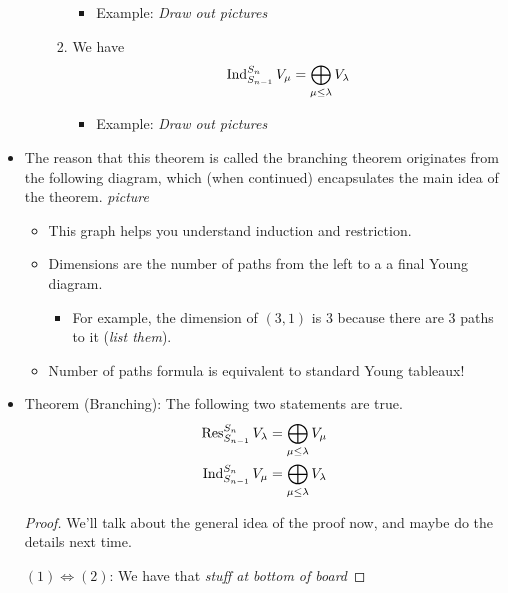 \documentclass[../notes.tex]{subfiles}
\begin{document}
\begin{itemize}
\begin{itemize}
\begin{enumerate}
\begin{itemize}
                \item Example: \emph{Draw out pictures}
            \end{itemize}
            \item We have
            \begin{equation*}
                \operatorname{Ind}_{S_{n-1}}^{S_n}V_\mu = \bigoplus_{\mu\leq\lambda}V_\lambda
            \end{equation*}
            \begin{itemize}
                \item Example: \emph{Draw out pictures}
            \end{itemize}
        \end{enumerate}
    \end{itemize}
    \item The reason that this theorem is called the branching theorem originates from the following diagram, which (when continued) encapsulates the main idea of the theorem.
    \emph{picture}
    \begin{itemize}
        \item This graph helps you understand induction and restriction.
        \item Dimensions are the number of paths from the left to a a final Young diagram.
        \begin{itemize}
            \item For example, the dimension of $(3,1)$ is 3 because there are 3 paths to it (\emph{list them}).
        \end{itemize}
        \item Number of paths formula is equivalent to standard Young tableaux!
    \end{itemize}
    \item Theorem (Branching): The following two statements are true.
    \begin{align}
        \operatorname{Res}_{S_{n-1}}^{S_n}V_\lambda &= \bigoplus_{\mu\leq\lambda}V_\mu\\
        \operatorname{Ind}_{S_{n-1}}^{S_n}V_\mu &= \bigoplus_{\mu\leq\lambda}V_\lambda
    \end{align}
    \begin{proof}
        We'll talk about the general idea of the proof now, and maybe do the details next time.

        \underline{$(1)\Longleftrightarrow(2)$}: We have that \emph{stuff at bottom of board}


\end{proof}
\end{itemize}
\end{document}
